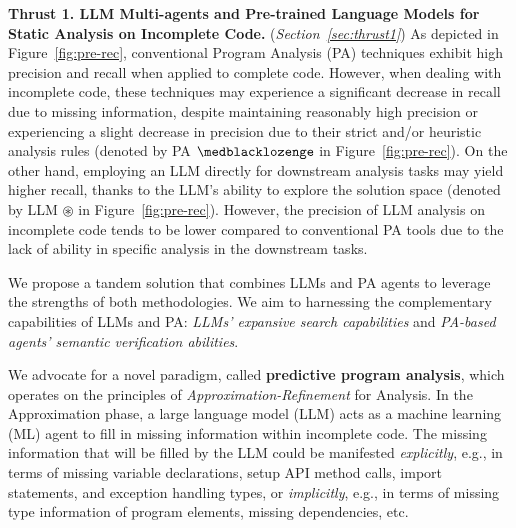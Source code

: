 \noindent \textbf{Thrust 1. LLM Multi-agents and Pre-trained Language Models for Static Analysis on Incomplete Code.} ({\em Section~\ref{sec:thrust1}})
As depicted in Figure~\ref{fig:pre-rec}, conventional Program Analysis
(PA) techniques exhibit high precision and recall when applied to
complete code. However, when dealing with incomplete code, these
techniques may experience a significant decrease in recall due to
missing information, despite maintaining reasonably high precision or
experiencing a slight decrease in precision due to their strict and/or
heuristic analysis rules (denoted by PA $\medblacklozenge$ in
Figure~\ref{fig:pre-rec}). On the other hand, employing an LLM directly
for downstream analysis tasks may yield higher recall, thanks to the
LLM's ability to explore the solution space (denoted by LLM
$\circledast$ in Figure~\ref{fig:pre-rec}). However, the precision of
  LLM analysis on incomplete code tends to be lower compared to
  conventional PA tools due to the lack of ability in specific
  analysis in the downstream tasks.

We propose a tandem solution that combines LLMs and PA agents to
leverage the strengths of both methodologies. We aim to harnessing the
complementary capabilities of LLMs and PA: {\em LLMs' expansive search
  capabilities} and {\em PA-based agents' semantic verification
  abilities}.

We advocate for a novel paradigm, called {\bf predictive program
  analysis}, which operates on the principles of {\em
  Approximation-Refinement} for Analysis. In the Approximation phase,
a large language model (LLM) acts as a machine learning (ML) agent to
fill in missing information within incomplete code. The missing
information that will be filled by the LLM could be manifested {\em
  explicitly}, e.g., in terms of missing variable declarations, setup
API method calls, import statements, and exception handling types, or
{\em implicitly}, e.g., in terms of missing type information of 
program elements, missing dependencies, etc.




